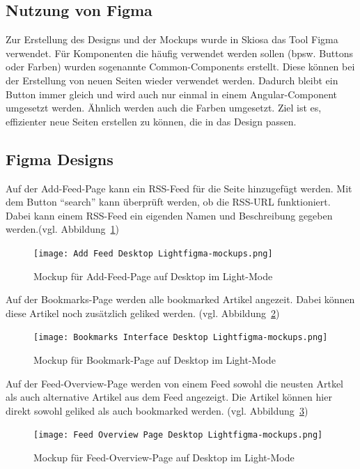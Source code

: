 \subsection{Nutzung von Figma}

Zur Erstellung des Designs und der Mockups wurde in Skiosa das Tool Figma verwendet. 
Für Komponenten die häufig verwendet werden sollen (bpsw. Buttons oder Farben) wurden sogenannte Common-Components erstellt.
Diese können bei der Erstellung von neuen Seiten wieder verwendet werden. 
Dadurch bleibt ein Button immer gleich und wird auch nur einmal in einem Angular-Component umgesetzt werden.
Ähnlich werden auch die Farben umgesetzt. 
Ziel ist es, effizienter neue Seiten erstellen zu können, die in das Design passen.

\subsection{Figma Designs}

Auf der Add-Feed-Page kann ein RSS-Feed für die Seite hinzugefügt werden. Mit dem Button \enquote{search} kann überprüft werden, ob die RSS-URL funktioniert.
Dabei kann einem RSS-Feed ein eigenden Namen und Beschreibung gegeben werden.(vgl. Abbildung~\ref{fig:Add Feed Desktop Light}) 
\begin{figure}[H]
    \texttt{[image: Add Feed Desktop Lightfigma-mockups.png]}
    \caption{Mockup für Add-Feed-Page auf Desktop im Light-Mode}
    \label{fig:Add Feed Desktop Light}
\end{figure}

Auf der Bookmarks-Page werden alle bookmarked Artikel angezeit.
Dabei können diese Artikel noch zusätzlich geliked werden. (vgl. Abbildung~\ref{fig:Bookmarks Interface Desktop Light})

\begin{figure}[H]
    \texttt{[image: Bookmarks Interface Desktop Lightfigma-mockups.png]}
    \caption{Mockup für Bookmark-Page auf Desktop im Light-Mode}
    \label{fig:Bookmarks Interface Desktop Light}
\end{figure}

Auf der Feed-Overview-Page werden von einem Feed sowohl die neusten Artkel als auch alternative Artikel aus dem Feed angezeigt.
Die Artikel können hier direkt sowohl geliked als auch bookmarked werden. (vgl. Abbildung~\ref{fig:Feed Overview Page Light Desktop})

\begin{figure}[H]
    \texttt{[image: Feed Overview Page Desktop Lightfigma-mockups.png]}
    \caption{Mockup für Feed-Overview-Page auf Desktop im Light-Mode}
    \label{fig:Feed Overview Page Light Desktop}
\end{figure}

